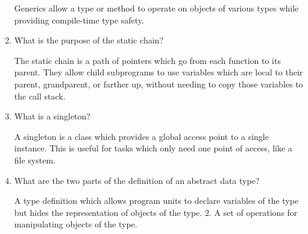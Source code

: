 \begin{enumerate}
\begin{answer}

    Generics allow a type or method to operate on objects of various types while providing compile-time type safety.
    
\end{answer}

  \item What is the purpose of the static chain?
  
\begin{answer}

  The static chain is a path of pointers which go from each function to its parent. They allow child subprograms to use variables which are local to their parent, grandparent, or farther up, without needing to copy those variables to the call stack.
  
\end{answer}

  \item What is a singleton?
  
\begin{answer}

  A singleton is a class which provides a global access point to a single instance. This is useful for tasks which only need one point of access, like a file system.
  
\end{answer}

  \item What are the two parts of the definition 
    of an abstract data type?
    
\begin{answer}

A type definition which allows program units to declare variables of the type but hides the representation of objects of the type. 2. A set of operations for manipulating objects of the type.

\end{answer}

  \end{enumerate}


